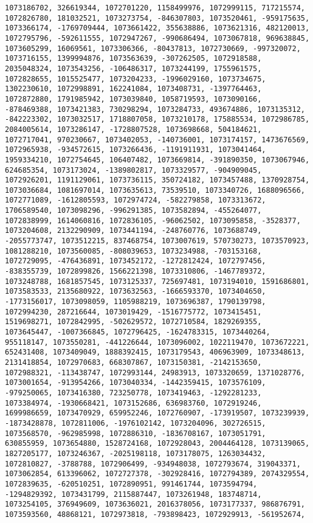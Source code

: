 \documentclass[11pt]{article}
\begin{document}
\begin{verbatim}
1073186702, 326619344, 1072701220, 1158499976, 1072999115, 717215574, 1072826780, 181032521, 1073273754, -846307803, 1073520461, -959175635, 1073366174, -1769709444, 1073661422, 355638886, 1073621316, 482120013, 1072795796, -592611555, 1072947267, -990686494, 1073067818, 969638845, 1073605299, 16069561, 1073306366, -80437813, 1072730669, -997320072, 1073716155, 1399994876, 1073563639, -307262505, 1072918588, 2035048324, 1073543256, -106486317, 1073244199, 1755961575, 1072828655, 1015525477, 1073204233, -1996029160, 1073734675, 1302230610, 1072998891, 162241084, 1073408731, -1397764463, 1072872880, 1791985942, 1073039840, 1058719593, 1073090166, -878469388, 1073421383, 730298294, 1073284733, 493674886, 1073135312, -842223302, 1073032517, 1718807058, 1073210178, 175885534, 1072986785, 2084005614, 1073286147, -1728807528, 1073698668, 504184621, 1072717041, 970230667, 1073402053, -140736001, 1073174157, 1473676569, 1072965938, -934572615, 1073266436, -1191911931, 1073041464, 1959334210, 1072754645, 106407482, 1073669814, -391890350, 1073067946, 624685354, 1073173024, -1389802817, 1073329577, -904909045, 1072926201, 1191129061, 1073736115, 350724182, 1073457488, 1370928754, 1073036684, 1081697014, 1073635613, 73539510, 1073340726, 1688096566, 1072771089, -1612805593, 1072974724, -582279858, 1073313672, 1706589540, 1073098296, -996291385, 1073582894, -455264077, 1072838999, 1614060816, 1072836105, -96062502, 1073095858, -3528377, 1073204608, 2132290909, 1073441194, -248760776, 1073688749, -2055773747, 1073512215, 837468754, 1073007619, 570730273, 1073570923, 1081288210, 1073560085, -808039653, 1073234988, -703153168, 1072729095, -476436891, 1073452172, -1272812424, 1072797456, -838355739, 1072899826, 1566221398, 1073310806, -1467789372, 1073248788, 1681857545, 1073125337, 725697481, 1073194010, 1591686801, 1073583533, 2135680922, 1073632563, -1666593370, 1073404650, -1773156017, 1073098059, 1105988219, 1073696387, 1790139798, 1072994230, 287216644, 1073019429, -1516775772, 1073415451, 1519698271, 1072842995, -502629572, 1072710584, 1829269355, 1073645447, -1007366845, 1072796425, -1624783315, 1073440264, 955118147, 1073550281, -441226644, 1073096002, 1022119470, 1073672221, 652431408, 1073409049, 1888392415, 1073179543, 406963909, 1073348613, 2131418854, 1072970683, 668307867, 1073150381, -2142153650, 1072988321, -113438747, 1072993144, 24983913, 1073320659, 1371028776, 1073001654, -913954266, 1073040334, -1442359415, 1073576109, -979250065, 1073416380, 723250778, 1073419463, -1292281233, 1073384974, -1930668421, 1073152686, 636983760, 1072919246, 1699986659, 1073470929, 659952246, 1072760907, -173919507, 1073239939, -1873428878, 1072811006, -1976102142, 1073204096, 302726515, 1073568570, -962985998, 1072886310, -1836708167, 1073051791, 630855959, 1073654880, 1528724168, 1072928043, 2004464128, 1073139065, 1827205177, 1073246367, -2025198118, 1073178075, 1263034432, 1072810827, -3788788, 1072906499, -934948038, 1072793674, 319043371, 1073062854, 613396062, 1072727378, -302928416, 1072794389, 2074329554, 1072839635, -620510251, 1072890951, 991461744, 1073594794, -1294829392, 1073431799, 2115887447, 1073261948, 183748714, 1073254105, 376949609, 1073636021, 2016378056, 1073177337, 986876791, 1073593560, 48868121, 1072973818, -793898423, 1072929913, -561952674, 
\end{verbatim}
\end{document}
